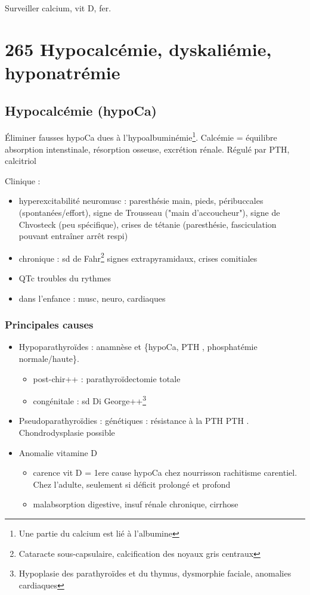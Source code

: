 \documentclass{book}
\begin{document}
Surveiller calcium, vit D, fer.

\section{265 \textdagger{} Hypocalcémie, dyskaliémie, hyponatrémie}
\label{sec:org1a29c96}

\subsection{Hypocalcémie (hypoCa)}
\label{sec:org5e7b90f}
Éliminer fausses hypoCa dues à l'hypoalbuminémie\footnote{Une partie du calcium est lié à l'albumine}.
Calcémie = équilibre absorption intenstinale, résorption osseuse, excrétion
rénale. Régulé par PTH, calcitriol

Clinique : 
\begin{itemize}
\item hyperexcitabilité neuromusc : paresthésie main, pieds, péribuccales
(spontanées/effort), signe de Trousseau ("main d'accoucheur"), signe de
Chvosteck (peu spécifique), crises de tétanie (paresthésie, fasciculation
pouvant entraîner arrêt respi)
\item chronique : sd de Fahr\footnote{Cataracte sous-capsulaire, calcification des noyaux gris centraux} \thus signes extrapyramidaux, crises comitiales
\item \inc QTc \thus troubles du rythmes
\item dans l'enfance : musc, neuro, cardiaques
\end{itemize}

\subsubsection{Principales causes}
\label{sec:orgc08e042}
\begin{itemize}
\item Hypoparathyroïdes : anamnèse et \{hypoCa, PTH \dec, phosphatémie
normale/haute\}.
\begin{itemize}
\item post-chir++ : parathyroïdectomie totale
\item congénitale : sd Di George++\footnote{Hypoplasie des parathyroïdes et du thymus, dysmorphie faciale, anomalies cardiaques}
\end{itemize}
\item Pseudoparathyroïdies : génétiques : résistance à la PTH \thus PTH
\inc. Chondrodysplasie possible
\item Anomalie vitamine D
\begin{itemize}
\item carence vit D = 1ere cause hypoCa chez nourrisson \thus rachitisme
carentiel. Chez l'adulte, seulement si déficit prolongé et profond
\item malabsorption digestive, insuf rénale chronique, cirrhose
\end{itemize}
\end{itemize}
\end{document}
